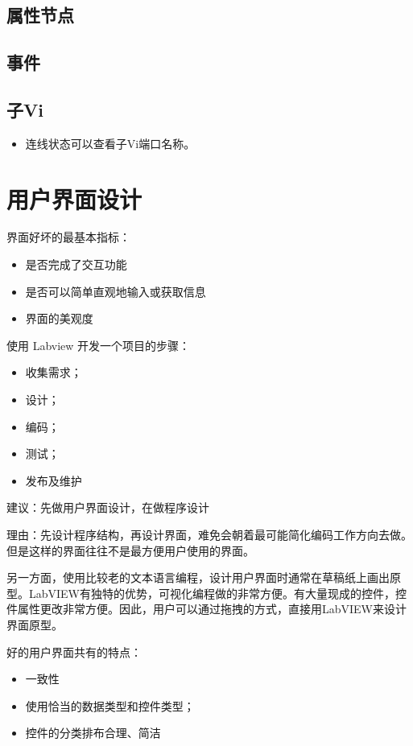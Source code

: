 \subsection{属性节点}
\subsection{事件}

\subsection{子Vi}
\begin{itemize}
\item 连线状态可以查看子Vi端口名称。
\end{itemize}



\section{用户界面设计}
界面好坏的最基本指标：
\begin{itemize}
\item 是否完成了交互功能
\item 是否可以简单直观地输入或获取信息
\item 界面的美观度
\end{itemize}

使用 Labview 开发一个项目的步骤：
\begin{itemize}
\item 收集需求； 
\item 设计；
\item 编码；
\item 测试；
\item 发布及维护
\end{itemize}

建议：先做用户界面设计，在做程序设计

理由：先设计程序结构，再设计界面，难免会朝着最可能简化编码工作方向去做。但是这样的界面往往不是最方便用户使用的界面。

另一方面，使用比较老的文本语言编程，设计用户界面时通常在草稿纸上画出原型。LabVIEW有独特的优势，可视化编程做的非常方便。有大量现成的控件，控件属性更改非常方便。因此，用户可以通过拖拽的方式，直接用LabVIEW来设计界面原型。

好的用户界面共有的特点：
\begin{itemize}
\item 一致性
\item 使用恰当的数据类型和控件类型；
\item 控件的分类排布合理、简洁
\end{itemize}

